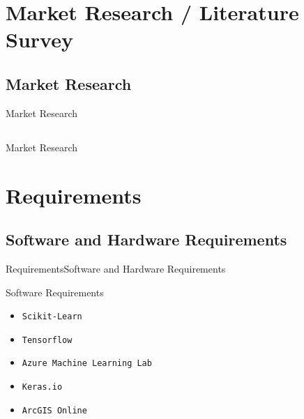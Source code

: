\documentclass[10pt]{beamer}
\begin{document}
\section{Market Research / Literature Survey}
\subsection{Market Research}
\begin{frame}{Market Research}
\end{frame}

\subsection{}
\begin{frame}{Market Research}

\end{frame}
    

\section{Requirements}
\subsection{Software and Hardware Requirements}

\begin{frame}{Requirements}{Software and Hardware Requirements}
  \begin{block}{Software Requirements}
  \begin{itemize}
    \item {\tt Scikit-Learn} \vspace{5pt}
    \item {\tt Tensorflow} \vspace{5pt} 
    \item {\tt Azure Machine Learning Lab} \vspace{5pt} 
    \item {\tt Keras.io} \vspace{5pt} 
    \item {\tt ArcGIS Online} \vspace{5pt} 
    \end{itemize}  
  \end{block}
\end{frame}
\end{document}
